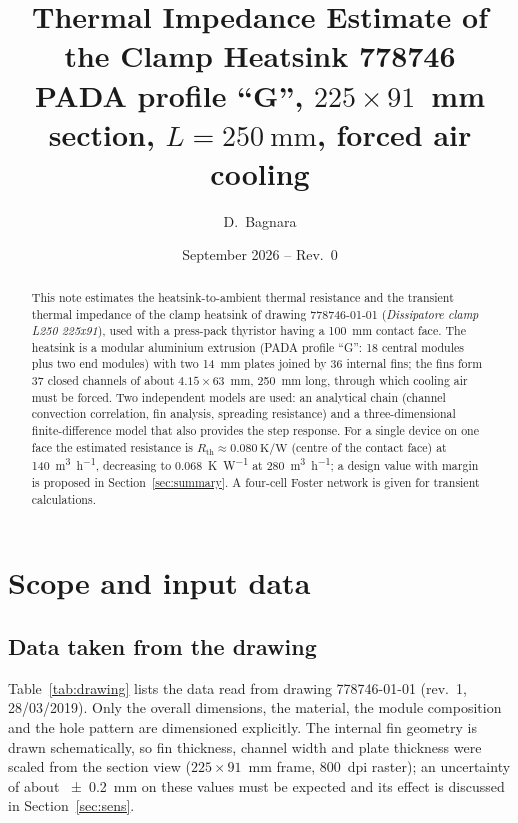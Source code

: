 \documentclass[11pt,a4paper]{article}
\title{Thermal Impedance Estimate of the Clamp Heatsink 778746\\
\large PADA profile ``G'', $225\times91$~mm section, $L=\SI{250}{\milli\metre}$, forced air cooling}
\author{D.~Bagnara}
\date{September 2026 -- Rev.~0}
\newcommand{\Rth}{R_{\mathrm{th}}}
\begin{document}
\maketitle

\begin{abstract}
This note estimates the heatsink-to-ambient thermal resistance and the transient thermal impedance of the clamp heatsink of drawing 778746-01-01 (\emph{Dissipatore clamp L250 225x91}), used with a press-pack thyristor having a \SI{100}{\milli\metre} contact face. The heatsink is a modular aluminium extrusion (PADA profile ``G'': 18 central modules plus two end modules) with two \SI{14}{\milli\metre} plates joined by 36 internal fins; the fins form 37 closed channels of about $4.15\times63$~mm, \SI{250}{\milli\metre} long, through which cooling air must be forced. Two independent models are used: an analytical chain (channel convection correlation, fin analysis, spreading resistance) and a three-dimensional finite-difference model that also provides the step response. For a single device on one face the estimated resistance is $\Rth\approx\SI{0.080}{\kelvin\per\watt}$ (centre of the contact face) at \SI{140}{\cubic\metre\per\hour}, decreasing to \SI{0.068}{\kelvin\per\watt} at \SI{280}{\cubic\metre\per\hour}; a design value with margin is proposed in Section~\ref{sec:summary}. A four-cell Foster network is given for transient calculations.
\end{abstract}

\section{Scope and input data}\label{sec:input}

\subsection{Data taken from the drawing}

Table~\ref{tab:drawing} lists the data read from drawing 778746-01-01 (rev.~1, 28/03/2019). Only the overall dimensions, the material, the module composition and the hole pattern are dimensioned explicitly. The internal fin geometry is drawn schematically, so fin thickness, channel width and plate thickness were scaled from the section view ($225\times91$~mm frame, 800~dpi raster); an uncertainty of about \SI{\pm 0.2}{\milli\metre} on these values must be expected and its effect is discussed in Section~\ref{sec:sens}.
\end{document}
